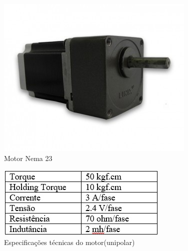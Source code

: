 \begin{figure}[!h]
\centering
\includegraphics[scale=0.8, angle = 360]{figuras/Motor}
\caption[]{Motor Nema 23}
\label{Motor Nema 23}
\end{figure}
\FloatBarrier

\begin{figure}[!h]
\centering
\includegraphics[scale=0.8, angle = 360]{figuras/tabela_unipolar}
\caption[]{Especificações técnicas do motor(unipolar)}
\label{Especificações técnicas do motor(unipolar)}
\end{figure}
\FloatBarrier

